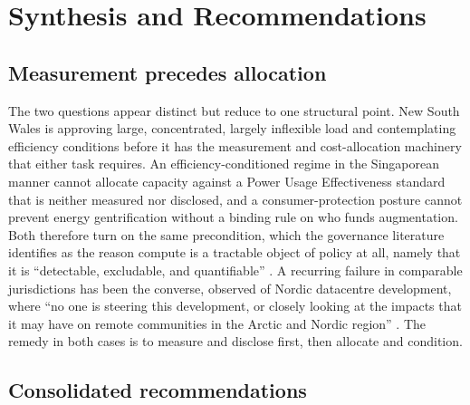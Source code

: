 \chapter{Synthesis and Recommendations}
\label{ch:supp:synthesis}

\section{Measurement precedes allocation}
\label{sec:supp:syn:thread}

The two questions appear distinct but reduce to one structural point. New South Wales is approving large, concentrated, largely inflexible load and contemplating efficiency conditions before it has the measurement and cost-allocation machinery that either task requires. An efficiency-conditioned regime in the Singaporean manner cannot allocate capacity against a Power Usage Effectiveness standard that is neither measured nor disclosed, and a consumer-protection posture cannot prevent energy gentrification without a binding rule on who funds augmentation. Both therefore turn on the same precondition, which the governance literature identifies as the reason compute is a tractable object of policy at all, namely that it is \enquote{detectable, excludable, and quantifiable} \autocite{sastryComputingPowerGovernance2024}. A recurring failure in comparable jurisdictions has been the converse, observed of Nordic datacentre development, where \enquote{no one is steering this development, or closely looking at the impacts that it may have on remote communities in the Arctic and Nordic region} \autocite{sovacoolWholeSystemsEnergy2022}. The remedy in both cases is to measure and disclose first, then allocate and condition.

\section{Consolidated recommendations}
\label{sec:supp:syn:recs}

